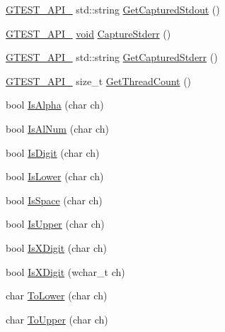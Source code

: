 \begin{DoxyCompactItemize}
\item 
\hyperlink{ts__gtest_8h_aa73be6f0ba4a7456180a94904ce17790}{G\-T\-E\-S\-T\-\_\-\-A\-P\-I\-\_\-} std\-::string \hyperlink{namespacetesting_1_1internal_aed657219a9856a8d249a3230de0c54ce}{Get\-Captured\-Stdout} ()
\item 
\hyperlink{ts__gtest_8h_aa73be6f0ba4a7456180a94904ce17790}{G\-T\-E\-S\-T\-\_\-\-A\-P\-I\-\_\-} \hyperlink{legacy_8hpp_a8bb47f092d473522721002c86c13b94e}{void} \hyperlink{namespacetesting_1_1internal_a8ec00d458d0d442bd64af7b5f9c22dda}{Capture\-Stderr} ()
\item 
\hyperlink{ts__gtest_8h_aa73be6f0ba4a7456180a94904ce17790}{G\-T\-E\-S\-T\-\_\-\-A\-P\-I\-\_\-} std\-::string \hyperlink{namespacetesting_1_1internal_a374156401da17704099d0c33fa53adfb}{Get\-Captured\-Stderr} ()
\item 
\hyperlink{ts__gtest_8h_aa73be6f0ba4a7456180a94904ce17790}{G\-T\-E\-S\-T\-\_\-\-A\-P\-I\-\_\-} size\-\_\-t \hyperlink{namespacetesting_1_1internal_a8cbd8bf820517923d7f3c4477b3af5fa}{Get\-Thread\-Count} ()
\item 
bool \hyperlink{namespacetesting_1_1internal_aeb957087fd6bbf9db98ab7cd41b0c129}{Is\-Alpha} (char ch)
\item 
bool \hyperlink{namespacetesting_1_1internal_a83802e7f23324cd512232203662e1a98}{Is\-Al\-Num} (char ch)
\item 
bool \hyperlink{namespacetesting_1_1internal_a4bd96b7fa6486802d33ddc217af55a39}{Is\-Digit} (char ch)
\item 
bool \hyperlink{namespacetesting_1_1internal_ac26ce3883bc8919c27074975e958f3b7}{Is\-Lower} (char ch)
\item 
bool \hyperlink{namespacetesting_1_1internal_af429e04f70f9c10f6aa76a5d1ccd389f}{Is\-Space} (char ch)
\item 
bool \hyperlink{namespacetesting_1_1internal_a84f3baa379fec6bf5947cb5165aa8cc9}{Is\-Upper} (char ch)
\item 
bool \hyperlink{namespacetesting_1_1internal_aa234ef141278263fb143b616c74c86e7}{Is\-X\-Digit} (char ch)
\item 
bool \hyperlink{namespacetesting_1_1internal_a6ab68a30f8291c09b2289c132bbe3b16}{Is\-X\-Digit} (wchar\-\_\-t ch)
\item 
char \hyperlink{namespacetesting_1_1internal_ad9c627ef2a94245e3fd69e7ab3d49b42}{To\-Lower} (char ch)
\item 
char \hyperlink{namespacetesting_1_1internal_ac1b876a8133895bd553d4780ecaa1e3a}{To\-Upper} (char ch)
\item 

\end{DoxyCompactItemize}
